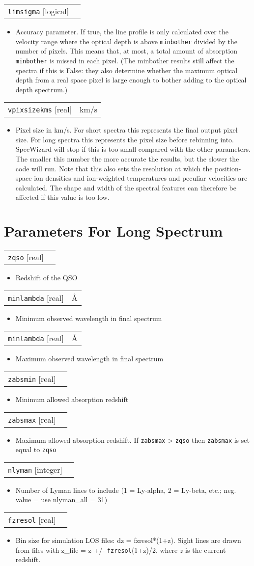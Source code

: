 \documentclass{report}
\makeatletter
\newcommand{\paramdefinition}[3]{
\begin{tabular*}{\textwidth}{l@{\extracolsep{\fill}}r}
		{\tt #1} [{\sc #2}]& #3 \\
\end{tabular*}}
\newcommand{\paramdescription}[1]{
\begin{itemize}
\item #1
\end{itemize}\vspace{0.2cm}}
\makeatother
\begin{document}
\paramdefinition{limsigma}{logical}{}
\paramdescription{Accuracy parameter. If true, the line profile is only calculated over the velocity range where the optical depth is above {\tt minbother} divided by the number of pixels. This means that, at most, a total amount of absorption {\tt minbother} is missed in each pixel. (The minbother results still affect the spectra if this is False: they also determine whether the maximum optical depth from a real space pixel is large enough to bother adding to the optical depth spectrum.)}

\paramdefinition{vpixsizekms}{real}{km/s}
\paramdescription{Pixel size in km/s.  For short spectra this represents the final output pixel size.  For long spectra this represents the pixel size before rebinning into. SpecWizard will stop if this is too small compared with the other parameters. The smaller this number the more accurate the results, but the slower the code will run. Note that this also sets the resolution at which the position-space ion densities and ion-weighted temperatures and peculiar velocities are calculated. The shape and width of the spectral features can therefore be affected if this value is too low.}

\section{Parameters For Long Spectrum}
\paramdefinition{zqso}{real}{}
\paramdescription{Redshift of the QSO}

\paramdefinition{minlambda}{real}{\AA{}}
\paramdescription{Minimum observed wavelength in final spectrum}

\paramdefinition{minlambda}{real}{\AA{}}
\paramdescription{Maximum observed wavelength in final spectrum}

\paramdefinition{zabsmin}{real}{}
\paramdescription{Minimum allowed absorption redshift}

\paramdefinition{zabsmax}{real}{}
\paramdescription{Maximum allowed absorption redshift.  If {\tt zabsmax} > {\tt zqso} then {\tt zabsmax} is set equal to {\tt zqso}}

\paramdefinition{nlyman}{integer}{}
\paramdescription{Number of Lyman lines to include (1 = Ly-alpha, 2 = Ly-beta, etc.; neg. value = use nlyman\_all = 31)}

\paramdefinition{fzresol}{real}{}
\paramdescription{Bin size for simulation LOS files: dz = fzresol*(1+z). Sight lines are drawn from files with z\_file = z +/- {\tt fzresol}(1+z)/2, where $z$ is the current redshift.}
\end{document}
